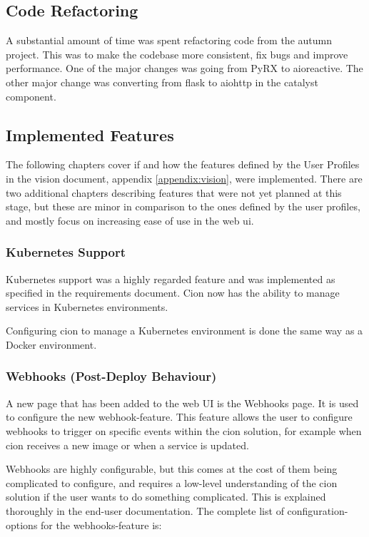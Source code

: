 \subsection{Code Refactoring}
\label{sec:coderefactoring}
A substantial amount of time was spent refactoring code from the autumn project. This was to make the codebase more consistent, fix bugs and improve performance. One of the major changes was going from PyRX to aioreactive. The other major change was converting from flask to aiohttp in the catalyst component. 




\subsection{Implemented Features}
The following chapters cover if and how the features defined by the User Profiles in the vision document, appendix \ref{appendix:vision}, were implemented. There are two additional chapters describing features that were not yet planned at this stage, but these are minor in comparison to the ones defined by the user profiles, and mostly focus on increasing ease of use in the web \acrshort{ui}.

\subsubsection{Kubernetes Support}
Kubernetes support was a highly regarded feature and was implemented as specified in the requirements document. Cion now has the ability to manage services in Kubernetes environments.

Configuring cion to manage a Kubernetes environment is done the same way as a Docker environment.


\subsubsection{Webhooks (Post-Deploy Behaviour)}
A new page that has been added to the web UI is the Webhooks page. It is used to configure the new webhook-feature. This feature allows the user to configure webhooks to trigger on specific events within the cion solution, for example when cion receives a new image or when a service is updated. 

Webhooks are highly configurable, but this comes at the cost of them being complicated to configure, and requires a low-level understanding of the cion solution if the user wants to do something complicated. This is explained thoroughly in the end-user documentation. The complete list of configuration-options for the webhooks-feature is:

